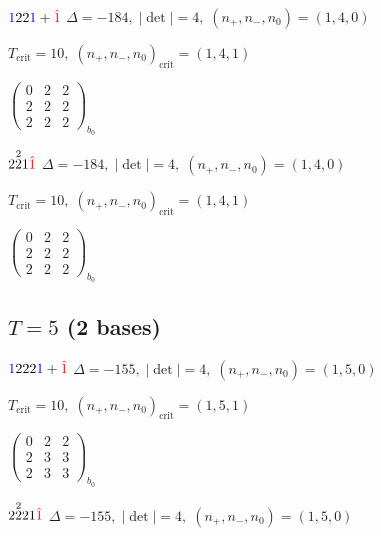 \documentclass[10pt]{article}
\begin{document}
$\textcolor{blue}{1}22\textcolor{blue}{1}+\textcolor{red}{\hat{1}}$ \quad $\Delta=-184,\; |\det|=4,\; (n_+,n_-,n_0)=(1,4,0)$

\hspace{1em}$T_{\text{crit}}=10,\; (n_+,n_-,n_0)_{\text{crit}}=(1,4,1)$

\hspace{2em}$\left(\begin{smallmatrix}0 & 2 & 2 \\ 2 & 2 & 2 \\ 2 & 2 & 2\end{smallmatrix}\right)_{\!b_0}$

\smallskip

$2\overset{2}{2}1\textcolor{red}{\hat{1}}$ \quad $\Delta=-184,\; |\det|=4,\; (n_+,n_-,n_0)=(1,4,0)$

\hspace{1em}$T_{\text{crit}}=10,\; (n_+,n_-,n_0)_{\text{crit}}=(1,4,1)$

\hspace{2em}$\left(\begin{smallmatrix}0 & 2 & 2 \\ 2 & 2 & 2 \\ 2 & 2 & 2\end{smallmatrix}\right)_{\!b_0}$


\subsection*{$T = 5$ \quad (2 bases)}
\smallskip

$\textcolor{blue}{1}222\textcolor{blue}{1}+\textcolor{red}{\hat{1}}$ \quad $\Delta=-155,\; |\det|=4,\; (n_+,n_-,n_0)=(1,5,0)$

\hspace{1em}$T_{\text{crit}}=10,\; (n_+,n_-,n_0)_{\text{crit}}=(1,5,1)$

\hspace{2em}$\left(\begin{smallmatrix}0 & 2 & 2 \\ 2 & 3 & 3 \\ 2 & 3 & 3\end{smallmatrix}\right)_{\!b_0}$

\smallskip

$2\overset{2}{2}21\textcolor{red}{\hat{1}}$ \quad $\Delta=-155,\; |\det|=4,\; (n_+,n_-,n_0)=(1,5,0)$
\end{document}
